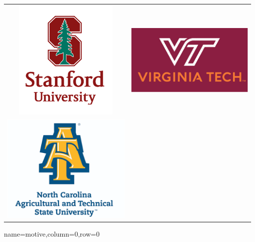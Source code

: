 \documentclass[landscape,paperwidth=70in,paperheight=46in,fontscale=0.225]{baposter} %
\begin{document}
\begin{poster}
{ 
\begin{tabular}{c c}
\includegraphics[scale=0.4]{logos/stanford.png} &
\includegraphics[scale=0.4]{logos/vt.png} \\
\includegraphics[scale=0.4]{logos/ncatnt.png} 
\end{tabular}
}

            

\vspace{-2.5in} %


          {name=motive,column=0,row=0}{

}
\end{poster}
\end{document}
